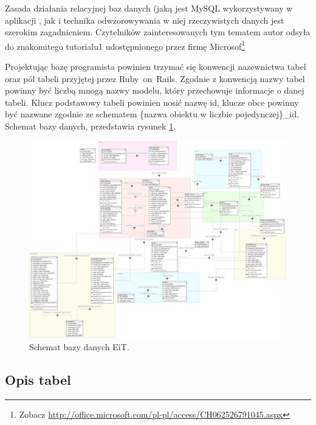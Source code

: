 \documentclass[a4paper,12pt,oneside]{report}
\begin{document}
Zasada działania relacyjnej baz danych (jaką jest MySQL wykorzystywany w aplikacji , jak i technika odwzorowywania w niej rzeczywistych danych jest szerokim zagadnieniem. Czytelników zainteresowanych tym tematem autor odsyła do znakomitego tutorialu1 udostępnionego przez firmę Microsof\footnote{Zobacz \url{http://office.microsoft.com/pl-pl/access/CH062526791045.aspx}}

Projektując bazę programista powinien trzymać się konwencji nazewnictwa tabel oraz pól tabeli przyjętej przez Ruby~on~Rails. Zgodnie z konwencją nazwy tabel powinny być liczbą mnogą nazwy modelu, który przechowuje informacje o danej tabeli. Klucz podstawowy tabeli powinien nosić nazwę id, klucze obce powinny być nazwane zgodnie ze schematem \{nazwa obiektu w liczbie pojedynczej\}\_id. Schemat bazy danych, przedstawia rysunek \ref{fig:database}.

\newpage
\thispagestyle{empty}
\addtolength{\textwidth}{4cm}
\addtolength{\hoffset}{-2.5cm}
\addtolength{\textheight}{5cm}
\addtolength{\voffset}{-3.5cm}
\begin{landscape}
\begin{figure}
\centering
  \includegraphics{database.png}
  \caption{
  Schemat bazy danych EiT.
  \label{fig:database}
  }
\end{figure}
\end{landscape}
\newpage

\addtolength{\textwidth}{-4cm}
\addtolength{\hoffset}{2.5cm}
\addtolength{\textheight}{-5cm}
\addtolength{\voffset}{3.5cm}
\subsection{Opis tabel}
\label{sub:tabele}
\end{document}
